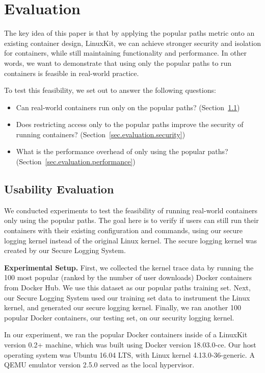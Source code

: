 \section{Evaluation}
\label{sec.evaluation}
The key idea of this paper is that by applying the popular paths metric onto an existing container design, LinuxKit, 
we can achieve stronger security and isolation for containers, while still maintaining functionality and performance. 
In other words, we want to demonstrate that using only the popular paths to run containers is feasible in real-world practice. 

To test this feasibility, we set out to answer the following questions: 

\begin{itemize}
\item Can real-world containers run only on the popular paths? (Section~{\ref{sec.evaluation.usability}})
\item Does restricting access only to the popular paths improve the security of  running containers? (Section~{\ref{sec.evaluation.security}})
\item What is the performance overhead of only using the popular paths? (Section~{\ref{sec.evaluation.performance}})
\end{itemize}

\subsection{Usability Evaluation}
\label{sec.evaluation.usability} 
We conducted experiments to test the feasibility of running real-world containers only using the popular paths. 
The goal here is to verify if users can still run their containers with their existing configuration and commands, 
using our secure logging kernel instead of the original Linux kernel. The secure logging kernel was created by our Secure Logging System.

\textbf{Experimental Setup.}
First, we collected the kernel trace data by running the 100 most popular (ranked by the number of user downloads) Docker containers from Docker Hub. 
We use this dataset as our popular paths training set. Next, our Secure Logging System used our training set data to instrument the Linux kernel, 
and generated our secure logging kernel. Finally, we ran another 100 popular Docker containers,  our testing set, on our security logging kernel. 

In our experiment, we ran the popular Docker containers inside of a LinuxKit version 0.2+ machine, which was built using Docker version 18.03.0-ce. 
Our host operating system was Ubuntu 16.04 LTS, with Linux kernel 4.13.0-36-generic. A QEMU emulator version 2.5.0 served as the local hypervisor. 

